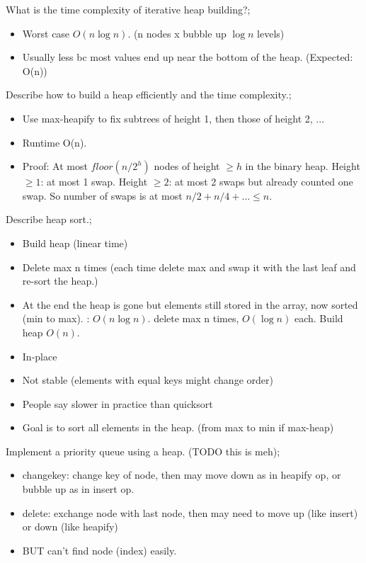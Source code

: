 \documentclass{article}
\begin{document}
What is the time complexity of iterative heap building?; \begin{itemize}
    \item Worst case $O(n\log n)$. (n nodes x bubble up $\log n$ levels)
    \item Usually less bc most values end up near the bottom of the heap. (Expected: O(n))
\end{itemize}

Describe how to build a heap efficiently and the time complexity.; \begin{itemize}
    \item Use max-heapify to fix subtrees of height 1, then those of height 2, ...
    \item Runtime O(n).
    \item Proof: At most $floor(n/2^h)$ nodes of height $\geq h$ in the binary heap. Height $\geq 1$: at most 1 swap. Height $\geq 2$: at most 2 swaps but already counted one swap. So number of swaps is at most $n/2+n/4+...\leq n$.
\end{itemize}

Describe heap sort.; \begin{itemize}
    \item Build heap (linear time)
    \item Delete max n times (each time delete max and swap it with the last leaf and re-sort the heap.)
    \item At the end the heap is gone but elements still stored in the array, now sorted (min to max).
    \Runtime: $O(n\log n)$. delete max n times, $O(\log n)$ each. Build heap $O(n)$.
    \item In-place
    \item Not stable (elements with equal keys might change order)
    \item People say slower in practice than quicksort
    \item Goal is to sort all elements in the heap. (from max to min if max-heap)
\end{itemize}

Implement a priority queue using a heap. (TODO this is meh); \begin{itemize}
    \item changekey: change key of node, then may move down as in heapify op, or bubble up as in insert op.
    \item delete: exchange node with last node, then may need to move up (like insert) or down (like heapify)
    \item BUT can't find node (index) easily.
\end{itemize}
\end{document}
